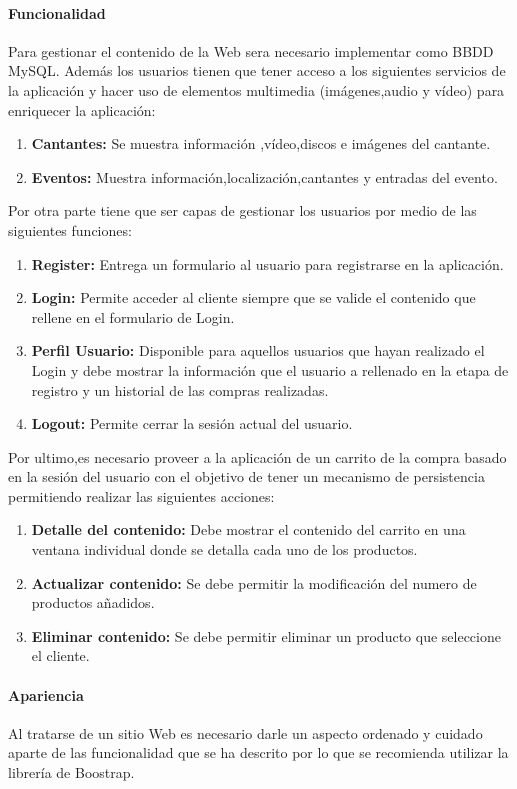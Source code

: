 \paragraph{Funcionalidad}
Para gestionar el contenido de la Web sera necesario implementar como BBDD MySQL. Además los usuarios tienen que tener acceso a los siguientes servicios de la aplicación y hacer uso de elementos multimedia (imágenes,audio y vídeo) para enriquecer la aplicación:
\begin{enumerate}
  \item \textbf{Cantantes:} Se muestra información ,vídeo,discos e imágenes del cantante.
  \item \textbf{Eventos:} Muestra información,localización,cantantes y entradas del evento.
\end{enumerate}
Por otra parte tiene que ser capas de gestionar los usuarios por medio de las siguientes funciones:
\begin{enumerate}
  \item \textbf{Register:} Entrega un formulario al usuario para registrarse en la aplicación.
  \item \textbf{Login:} Permite acceder al cliente siempre que se valide el contenido que rellene en el formulario de Login.
  \item \textbf{Perfil Usuario:} Disponible para aquellos usuarios que hayan realizado el Login y debe mostrar la información que el usuario a rellenado en la etapa de registro y un historial de las compras realizadas.
  \item \textbf{Logout:} Permite cerrar la sesión actual del usuario.
\end{enumerate}
Por ultimo,es necesario proveer a la aplicación de un carrito de la compra basado en la sesión del usuario con el objetivo de tener un mecanismo de persistencia permitiendo realizar las siguientes acciones:
\begin{enumerate}
  \item \textbf{Detalle del contenido:} Debe mostrar el contenido del carrito en una ventana individual  donde se detalla cada uno de los productos.
  \item \textbf{Actualizar contenido:} Se debe permitir la modificación del numero de productos añadidos.
  \item \textbf{Eliminar contenido:} Se debe permitir eliminar un producto que seleccione el cliente.
\end{enumerate}
\paragraph{Apariencia}
Al tratarse de un sitio Web es necesario darle un aspecto ordenado y cuidado aparte de las funcionalidad que se ha descrito por lo que se recomienda utilizar la librería de Boostrap.
